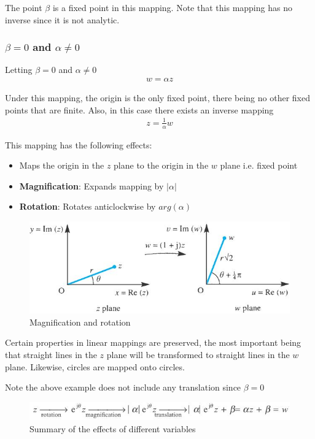 \documentclass[10pt,a4paper]{article}
\begin{document}
The point $\beta$ is a ﬁxed point in this mapping. Note that this mapping has no inverse since it is
not analytic.

\pagebreak

\subsubsection{$\beta=0$ and $\alpha \neq 0$}

Letting $\beta=0$ and $\alpha \neq 0$
\begin{align*}
    w = \alpha z
\end{align*}

Under this mapping, the origin is the only ﬁxed point, there being no other ﬁxed points that are
ﬁnite. Also, in this case there exists an inverse mapping
\begin{align*}
    z = \frac{1}{\alpha}w
\end{align*}

This mapping has the following effects:
\begin{itemize}
    \item Maps the origin in the $z$ plane to the origin in the $w$ plane i.e. ﬁxed point
    \item \textbf{Magniﬁcation}: Expands mapping  by $|\alpha|$ 
    \item \textbf{Rotation}: Rotates anticlockwise by $arg(\alpha)$
\end{itemize}
\begin{figure} [h!]
    \centering
    \includegraphics[scale=0.7]{betaal.JPG}
    \caption{Magnification and rotation}
\end{figure}

Certain properties in linear mappings are preserved, the most important being that straight lines in
the $z$ plane will be transformed to straight lines in the $w$ plane. Likewise, circles are mapped onto circles.

Note the above example does not include any translation since $\beta = 0$
\begin{figure} [h!]
    \centering
    \includegraphics[scale=0.8]{TR.JPG}
    \caption{Summary of the effects of different variables}
\end{figure}
\end{document}

